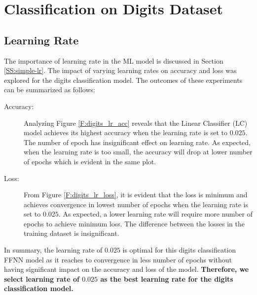 \documentclass[12pt, a4paper, twoside]{article}
\begin{document}
\section{Classification on Digits Dataset}\label{S:digits}
\subsection{Learning Rate}\label{SS:digits-lr}
The importance of learning rate in the ML model is discussed in Section \ref{SS:simple-lr}. The impact of varying learning rates on accuracy and loss was explored for the digits classification model. The outcomes of these experiments can be summarized as follows:
\begin{description}
	\item[Accuracy:] Analyzing Figure \ref{F:digits_lr_acc} reveals that the Linear Classifier (LC) model achieves its highest accuracy when the learning rate is set to $0.025$. The number of epoch has insignificant effect on learning rate. As expected, when the learning rate is too small, the accuracy will drop at lower number of epochs which is evident in the same plot. 
	\item[Loss:] From Figure \ref{F:digits_lr_loss}, it is evident that the loss is minimum and achieves convergence in lowest number of epochs when the learning rate is set to $0.025$. As expected, a lower learning rate will require more number of epochs to achieve minimum loss. The difference between the losses in the training dataset is insignificant. 
\end{description}
\par
In summary, the learning rate of $0.025$ is optimal for this digits classification FFNN model as it reaches to convergence in less number of epochs without having significant impact on the accuracy and loss of the model. \textbf{Therefore, we select learning rate of $0.025$ as the best learning rate for the digits classification model.}
\end{document}
